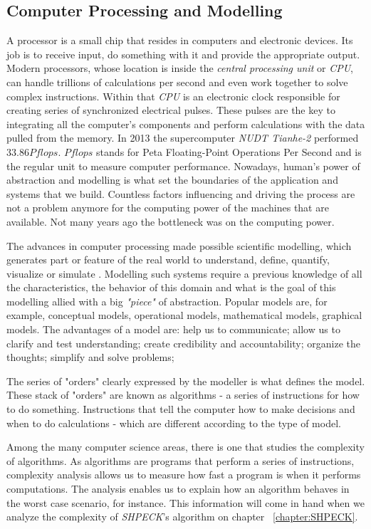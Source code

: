 \documentclass[ppgc,mestrado,english]{iiufrgs}
\begin{document}
\subsection{Computer Processing and Modelling}
A processor is a small chip that resides in computers and electronic devices. Its job is to receive input, do something with it and provide the appropriate output. Modern processors, whose location is inside the \emph{central processing unit} or \emph{CPU}, can handle trillions of calculations per second and even work together to solve complex instructions. Within that \emph{CPU} is an electronic clock responsible for creating series of synchronized electrical pulses. These pulses are the key to integrating all the computer's components and perform calculations with the data pulled from the memory. In 2013 the supercomputer \emph{NUDT Tianhe-2} performed $33.86 Pflops$. $Pflops$ stands for Peta Floating-Point Operations Per Second and is the regular unit to measure computer performance.
Nowadays, human's power of abstraction and modelling is what set the boundaries of the application and systems that we build. Countless factors influencing and driving the process are not a problem anymore for the computing power of the machines that are available. Not many years ago the bottleneck was on the computing power.

The advances in computer processing made possible scientific modelling, which generates part or feature of the real world to understand, define, quantify, visualize or simulate \cite{Humphreys:04}. Modelling such systems require a previous knowledge of all the characteristics, the behavior of this domain and what is the goal of this modelling allied with a big \emph{"piece"} of abstraction. Popular models are, for example, conceptual models, operational models, mathematical models, graphical models. The advantages of a model are: help us to communicate; allow us to clarify and test understanding; create credibility and accountability; organize the thoughts; simplify and solve problems;

The series of "orders" clearly expressed by the modeller is what defines the model. These stack of "orders" are known as algorithms - a series of instructions for how to do something. Instructions that tell the computer how to make decisions and when to do calculations - which are different according to the type of model.

Among the many computer science areas, there is one that studies the complexity of algorithms. As algorithms are programs that perform a series of instructions, complexity analysis allows us to measure how fast a program is when it performs computations. The analysis enables us to explain how an algorithm behaves in the worst case scenario, for instance.
This information will come in hand when we analyze the complexity of \emph{SHPECK}'s algorithm on chapter ~\ref{chapter:SHPECK}.
\end{document}
